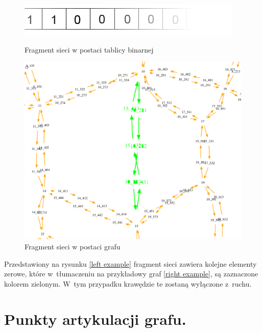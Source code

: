 \documentclass[twoside,12pt]{report}
\begin{document}
\begin{figure}[ht]
\begin{flushleft}
	\begin{minipage}[c]{.47\textwidth}
	\vspace*{80px}
	\centering
	\includegraphics[width=\textwidth]{img/bool}
	\caption{Fragment sieci w postaci tablicy binarnej }
	\label{left-example}
	\end{minipage}%
\end{flushleft}
\begin{flushright}
	\begin{minipage}[c]{.47\textwidth}
	\centering
	\includegraphics[width=\textwidth]{img/bool-efect}
	\caption{Fragment sieci w postaci grafu}
	\label{right-example}
	\end{minipage}
\end{flushright}
\end{figure}

Przedstawiony na rysunku \ref{left example} fragment sieci zawiera kolejne elementy zerowe, które w~tłumaczeniu na przykładowy graf \ref{right example}, są zaznaczone kolorem zielonym. W~tym przypadku krawędzie te zostaną wyłączone z~ruchu. 

\section{Punkty artykulacji grafu.}
\end{document}
